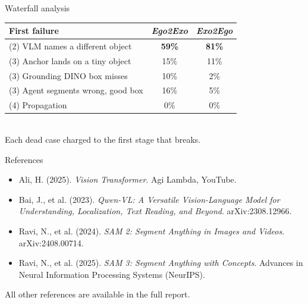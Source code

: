 \documentclass[professionalfonts,aspectratio=169]{beamer}
\begin{document}
\begin{frame}[t]
\begin{center}
{\large Waterfall analysis}
\end{center}
\vfill
    \centering
    \small
    \setlength{\tabcolsep}{4pt}
    \begin{tabular}{lcc}
      \toprule
      First failure & \textit{Ego2Exo} & \textit{Exo2Ego} \\
      \midrule
        (2) VLM names a different object        & \textbf{59\%} & \textbf{81\%} \\
        (3) Anchor lands on a tiny object       & 15\% & 11\% \\
        (3) Grounding DINO box misses           & 10\% & 2\%  \\
        (3) Agent segments wrong, good box      & 16\% & 5\%  \\
        (4) Propagation                         & 0\%  & 0\%  \\
      \bottomrule
    \end{tabular}
    \\[0.6em]
    {\scriptsize Each dead case charged to the first stage that breaks.}
\vfill
\end{frame}

\begin{frame}[t]
\begin{center}
    {\large References}
\end{center}
\vfill
\begin{itemize}
  \small
  \item[$\bullet$] Ali, H. (2025). \textit{Vision Transformer}. Agi Lambda, YouTube.
  \item[$\bullet$] Bai, J., et al. (2023). \textit{Qwen-VL: A Versatile Vision-Language Model for Understanding, Localization, Text Reading, and Beyond}. arXiv:2308.12966.
  \item[$\bullet$] Ravi, N., et al. (2024). \textit{SAM 2: Segment Anything in Images and Videos}. arXiv:2408.00714.
  \item[$\bullet$] Ravi, N., et al. (2025). \textit{SAM 3: Segment Anything with Concepts}. Advances in Neural Information Processing Systems (NeurIPS).
\end{itemize}
\vfill
\begin{center}
\small All other references are available in the full report.
\end{center}
\vfill
\end{frame}
\end{document}
